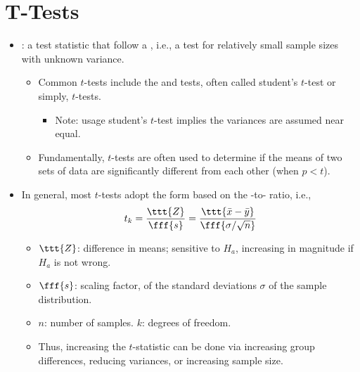 \section{T-Tests}
\begin{itemize}
  \item {}: a test statistic that follow a \hyperref[Subsection: Primer: Probability Distributions]{}, i.e., a test for relatively small sample sizes with unknown variance. 
    \begin{itemize}
      \item Common \(t\)-tests include the \hyperref[Subsection: One-Sample and Two-Sample T-Tests]{} and \hyperref[Subsection: One-Sample and Two-Sample T-Tests]{} tests, often called student's \(t\)-test or simply, \(t\)-tests.
        \begin{itemize}
          \item Note: usage student's \(t\)-test implies the variances are assumed near equal.
        \end{itemize}
      \item Fundamentally, \(t\)-tests are often used to determine if the means of two sets of data are significantly different from each other (when \(p < t\)).
    \end{itemize}
  \item In general, most \(t\)-tests adopt the form based on the -to- ratio, i.e., 
  \[%
  t_k = \frac{\ttt{Z}}{\fff{s}} = \frac{\ttt{\bar{x}-\bar{y}}}{\fff{\sigma/\sqrt{n}}}
  \]%
  \begin{itemize}
    \item \(\ttt{Z}\): difference in means; sensitive to \(H_a\), increasing in magnitude if \(H_a\) is not wrong.
    \item \(\fff{s}\): scaling factor, of the standard deviations \(\sigma \) of the sample distribution. 
    \item \(n\): number of samples. \(k\): degrees of freedom.
    \item Thus, increasing the \(t\)-statistic can be done via increasing group differences, reducing variances, or increasing sample size.
  \end{itemize}


\end{itemize}
